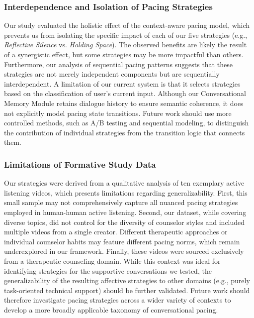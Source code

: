 \subsubsection{Interdependence and Isolation of Pacing Strategies}
Our study evaluated the holistic effect of the context-aware pacing model, which prevents us from isolating the specific impact of each of our five strategies (e.g., \emph{Reflective Silence} vs. \emph{Holding Space}).
The observed benefits are likely the result of a synergistic effect, but some strategies may be more impactful than others. 
Furthermore, our analysis of sequential pacing patterns suggests that these strategies are not merely independent components but are sequentially interdependent. A limitation of our current system is that it selects strategies based on the classification of user's current input. Although our Conversational Memory Module retains dialogue history to ensure semantic coherence, it does not explicitly model pacing state transitions. Future work should use more controlled methods, such as A/B testing and sequential modeling, to distinguish the contribution of individual strategies from the transition logic that connects them.

\subsubsection{Limitations of Formative Study Data}
\label{subsubsec:formative}
Our strategies were derived from a qualitative analysis of ten exemplary active listening videos, which presents limitations regarding generalizability. First, this small sample may not comprehensively capture all nuanced pacing strategies employed in human-human active listening. 
Second, our dataset, while covering diverse topics, did not control for the diversity of counselor styles and included multiple videos from a single creator. Different therapeutic approaches or individual counselor habits may feature different pacing norms, which remain underexplored in our framework.
Finally, these videos were sourced exclusively from a therapeutic counseling domain. While this context was ideal for identifying strategies for the supportive conversations we tested, the generalizability of the resulting affective strategies to other domains (e.g., purely task-oriented technical support) should be further validated. Future work should therefore investigate pacing strategies across a wider variety of contexts to develop a more broadly applicable taxonomy of conversational pacing.

